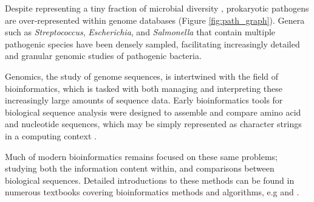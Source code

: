 Despite representing a tiny fraction of microbial diversity \citep{Balloux2017}, prokaryotic pathogens are over-represented within genome databases (Figure \ref{fig:path_graph}). Genera such as \textit{Streptococcus}, \textit{Escherichia}, and \textit{Salmonella} that contain multiple pathogenic species have been densely sampled, facilitating increasingly detailed and granular genomic studies of pathogenic bacteria.\par

Genomics, the study of genome sequences, is intertwined with the field of bioinformatics, which is tasked with both managing and interpreting these increasingly large amounts of sequence data. Early bioinformatics tools for biological sequence analysis were designed to assemble \citep{Dayhoff:1962:CCP:1461518.1461546,Staden1979} and compare \citep{NEEDLEMAN1970443,Smith_Waterman_1981,Thompson_Higgins_Gibson_1994,Felsenstein_1981} amino acid and nucleotide sequences, which may be simply represented as character strings in a computing context \citep{Gauthier2018-bk}.\par
Much of modern bioinformatics remains focused on these same problems; studying both the information content within, and comparisons between biological sequences. Detailed introductions to these methods can be found in numerous textbooks covering bioinformatics methods and algorithms, e.g \cite{Eddy_BSA_1998,Mount_2004} and \cite{Waterman_1995}.

